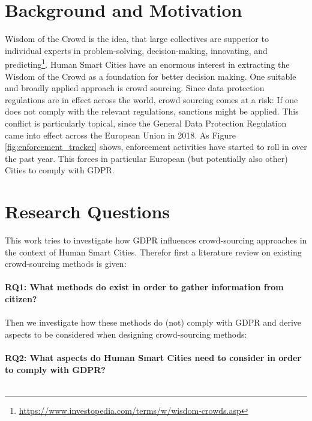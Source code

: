 \documentclass[a4paper,12pt]{report}
\begin{document}
	\section{Background and Motivation}
	\startsection
		Wisdom of the Crowd is the idea, that large collectives are supperior to individual experts in problem-solving, decision-making, innovating, and predicting\footnote{\url{https://www.investopedia.com/terms/w/wisdom-crowds.asp}}. 
		Human Smart Cities have an enormous interest in extracting the Wisdom of the Crowd as a foundation for better decision making.
		One suitable and broadly applied approach is crowd sourcing.
		Since data protection regulations are in effect across the world, crowd sourcing comes at a risk: If one does not comply with the relevant regulations, sanctions might be applied.
		This conflict is particularly topical, since the General Data Protection Regulation came into effect across the European Union in 2018.
		As Figure \ref{fig:enforcement_tracker} shows, enforcement activities have started to roll in over the past year. This forces in particular European (but potentially also other) Cities to comply with GDPR.
	\closesection

	\section{Research Questions}
	\startsection
		This work tries to investigate how GDPR influences crowd-sourcing approaches in the context of Human Smart Cities.
		Therefor first a literature review on existing crowd-sourcing methods is given:\\\\
		\textbf{RQ1: What methods do exist in order to gather information from citizen?}\label{RQ1}\\\\
		Then we investigate how these methods do (not) comply with GDPR and derive aspects to be considered when designing crowd-sourcing methods:\\\\
		\textbf{RQ2: What aspects do Human Smart Cities need to consider in order to comply with GDPR?}\label{RQ2}\\\\
	\closesection
	
	
\end{document}
